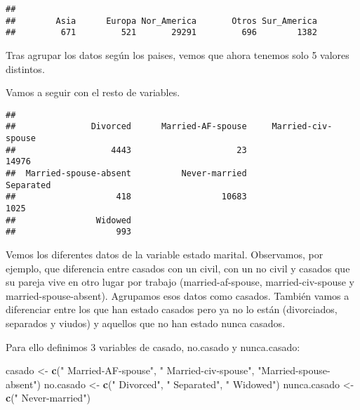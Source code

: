 \documentclass[]{article}
\newenvironment{Shaded}{\begin{snugshade}}{\end{snugshade}}
\newcommand{\DataTypeTok}[1]{\textcolor[rgb]{0.13,0.29,0.53}{#1}}
\newcommand{\KeywordTok}[1]{\textcolor[rgb]{0.13,0.29,0.53}{\textbf{#1}}}
\newcommand{\NormalTok}[1]{#1}
\newcommand{\OperatorTok}[1]{\textcolor[rgb]{0.81,0.36,0.00}{\textbf{#1}}}
\newcommand{\StringTok}[1]{\textcolor[rgb]{0.31,0.60,0.02}{#1}}
\begin{document}
\begin{verbatim}
## 
##        Asia      Europa Nor_America       Otros Sur_America 
##         671         521       29291         696        1382
\end{verbatim}

Tras agrupar los datos según los paises, vemos que ahora tenemos solo 5
valores distintos.

Vamos a seguir con el resto de variables.

\begin{Shaded}
\end{Shaded}

\begin{verbatim}
## 
##               Divorced      Married-AF-spouse     Married-civ-spouse 
##                   4443                     23                  14976 
##  Married-spouse-absent          Never-married              Separated 
##                    418                  10683                   1025 
##                Widowed 
##                    993
\end{verbatim}

Vemos los diferentes datos de la variable estado marital. Observamos,
por ejemplo, que diferencia entre casados con un civil, con un no civil
y casados que su pareja vive en otro lugar por trabajo
(married-af-spouse, married-civ-spouse y married-spouse-absent).
Agrupamos esos datos como casados. También vamos a diferenciar entre los
que han estado casados pero ya no lo están (divorciados, separados y
viudos) y aquellos que no han estado nunca casados.

Para ello definimos 3 variables de casado, no.casado y nunca.casado:

\begin{Shaded}
\begin{Highlighting}[]
\NormalTok{casado \textless{}{-}}\StringTok{ }\KeywordTok{c}\NormalTok{(}\StringTok{" Married{-}AF{-}spouse"}\NormalTok{, }\StringTok{" Married{-}civ{-}spouse"}\NormalTok{, }\StringTok{"Married{-}spouse{-}absent"}\NormalTok{)}
\NormalTok{no.casado \textless{}{-}}\StringTok{ }\KeywordTok{c}\NormalTok{(}\StringTok{" Divorced"}\NormalTok{, }\StringTok{" Separated"}\NormalTok{, }\StringTok{" Widowed"}\NormalTok{)}
\NormalTok{nunca.casado \textless{}{-}}\StringTok{ }\KeywordTok{c}\NormalTok{(}\StringTok{" Never{-}married"}\NormalTok{)}
\end{Highlighting}
\end{Shaded}
\end{document}
